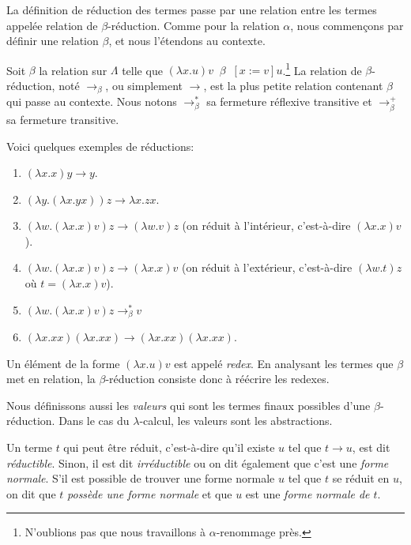 La définition de réduction des termes passe par une relation entre les
termes appelée relation de $\beta$-réduction.
Comme pour la relation $\alpha$, nous commençons par définir une relation
$\beta$, et nous l'étendons au contexte.

\begin{definition} 
  Soit $\beta$ la relation sur $\Lambda$ telle que $(\lambda x . u) v \; \; \beta 
  \; \; [x := v]u$.\footnote{N'oublions pas que nous travaillons à
    $\alpha$-renommage près.}
  La relation de $\beta$-réduction, noté $\rightarrow_{\beta}$, ou simplement
  $\rightarrow$, est la plus petite relation contenant $\beta$ qui passe au
  contexte. Nous notons $\rightarrow^{*}_{\beta}$ sa fermeture réflexive
  transitive et $\rightarrow^{+}_{\beta}$ sa fermeture transitive.
\end{definition}

Voici quelques exemples de réductions:
\begin{exemple}
  \begin{enumerate}
  \item $(\lambda x . x) y \rightarrow y$.
  \item $(\lambda y . (\lambda x . y x)) z \rightarrow \lambda x . z x$.
  \item $(\lambda w . (\lambda x . x) v) z \rightarrow (\lambda w. v) z$ (on
    réduit à l'intérieur, c'est-à-dire $(\lambda x . x) v$).
  \item $(\lambda w . (\lambda x . x) v) z \rightarrow (\lambda x. x) v$ (on
    réduit à l'extérieur, c'est-à-dire $(\lambda w . t) z$ où $t = (\lambda x .
    x) v$).
  \item $(\lambda w . (\lambda x . x) v) z \rightarrow^{*}_{\beta} v$
  \item $(\lambda x . xx) (\lambda x . xx) \rightarrow (\lambda x . xx)
    (\lambda x . xx)$.
  \end{enumerate}
\end{exemple}

Un élément de la forme $(\lambda x . u) v$ est appelé \textit{redex}. En
analysant les termes que $\beta$ met en relation, la
$\beta$-réduction consiste donc à réécrire les redexes.

Nous définissons aussi les \textit{valeurs} qui sont les termes finaux
possibles d'une $\beta$-réduction. Dans le cas du $\lambda$-calcul, les valeurs
sont les abstractions.

Un terme $t$ qui peut être réduit, c'est-à-dire qu'il existe $u$ tel que $t
\rightarrow u$, est dit \textit{réductible}. Sinon, il est dit
\textit{irréductible} ou on dit également que c'est une \textit{forme normale}.
S'il est possible de trouver une forme normale $u$ tel que $t$ se réduit en $u$,
on dit que $t$ \textit{possède une forme normale} et que $u$ est une
\textit{forme normale de $t$}.

